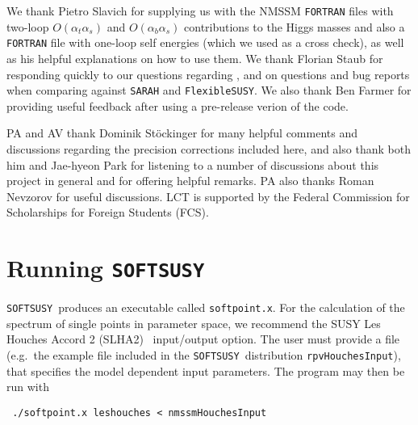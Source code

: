 \documentclass[final,3p,times,pdflatex]{elsarticle}
\def\SOFTSUSY{{\tt SOFTSUSY}}
\def\code#1{\small{\tt #1}\normalsize}
\def\at{\alpha_t}
\def\ab{\alpha_b}
\def\as{\alpha_s}
\def\oatas{O(\at\as)}
\def\oabas{O(\ab\as)}
\begin{document}
We thank Pietro Slavich for supplying us with the NMSSM {\tt FORTRAN} files with
two-loop $\oatas$ and $\oabas$ contributions to the Higgs masses and also a
{\tt FORTRAN} file with one-loop self energies (which we used as a cross check),
 as well as his helpful explanations on how to use them. We thank Florian 
Staub for responding quickly to our questions regarding \cite{Staub:2010ty}, and
 on questions and bug reports when comparing against {\tt SARAH} and 
{\tt FlexibleSUSY}. We also thank Ben Farmer for providing useful feedback after
 using a pre-release verion of the code.  

PA and AV thank Dominik St\"ockinger for many helpful comments and discussions 
regarding the precision corrections included here, and also thank both him and 
Jae-hyeon Park for listening to a number of discussions about this project in 
general and for offering helpful remarks. PA also thanks Roman Nevzorov for 
useful discussions.  LCT is supported by the Federal Commission for Scholarships
 for Foreign Students (FCS).  

\appendix

\section{Running \SOFTSUSY}
\label{sec:run}

\SOFTSUSY~produces an executable called \code{softpoint.x}. For the calculation
of the spectrum of single points in parameter space, we recommend the
SUSY Les Houches Accord 2 (SLHA2)~\cite{Allanach:2008qq}  input/output
option. The user must provide a file (e.g.\ the example file included
in the \SOFTSUSY~distribution
\code{rpvHouchesInput}), that specifies the model dependent input
parameters. The program may then be run with
\small
\begin{verbatim}
 ./softpoint.x leshouches < nmssmHouchesInput
\end{verbatim}
\normalsize
\end{document}

